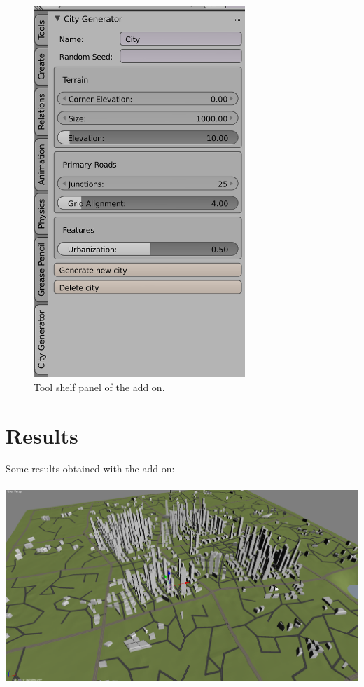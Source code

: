 \documentclass[a4paper,12pt]{scrartcl}
\begin{document}
\begin{figure}[h]
\center
\includegraphics[width=8cm]{param.png}
\caption{Tool shelf panel of the add on.}
\label{fig:param}
\end{figure}

\section{Results}
Some results obtained with the add-on: \\ \\

\center
\includegraphics[width=\textheight,angle=90]{view1.png}
\end{document}
